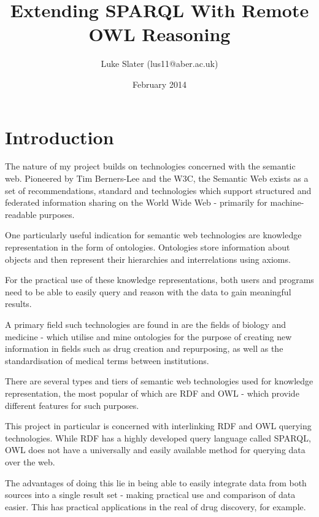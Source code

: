 \documentclass{article}
\begin{document}
\setlength{\parskip}{\medskipamount}
\setlength{\parindent}{0pt}

\title{Extending SPARQL With Remote OWL Reasoning}
\author{Luke Slater (lus11@aber.ac.uk)}
\date{February 2014}

\maketitle

\pagebreak

\section{Introduction}

The nature of my project builds on technologies concerned with the semantic web.
Pioneered by Tim Berners-Lee and the W3C, the Semantic Web exists as a set of
recommendations, standard and technologies which support structured and
federated information sharing on the World Wide Web - primarily for
machine-readable purposes.

One particularly useful indication for semantic web technologies are knowledge
representation in the form of ontologies. Ontologies store information about
objects and then represent their hierarchies and interrelations using axioms.

For the practical use of these knowledge representations, both users and
programs need to be able to easily query and reason with the data to gain
meaningful results. 

A primary field such technologies are found in are the fields of biology and
medicine - which utilise and mine ontologies for the purpose of creating new
information in fields such as drug creation and repurposing, as well as the
standardisation of medical terms between institutions.

There are several types and tiers of semantic web technologies used for
knowledge representation, the most popular of which are RDF and OWL - which
provide different features for such purposes.

This project in particular is concerned with interlinking RDF and OWL querying
technologies. While RDF has a highly developed query language
called SPARQL, OWL does not have a universally and easily available method for
querying data over the web.

The advantages of doing this lie in being able to easily integrate data from
both sources into a single result set - making practical use and comparison of
data easier. This has practical applications in the real of drug discovery, for
example.
\end{document}
